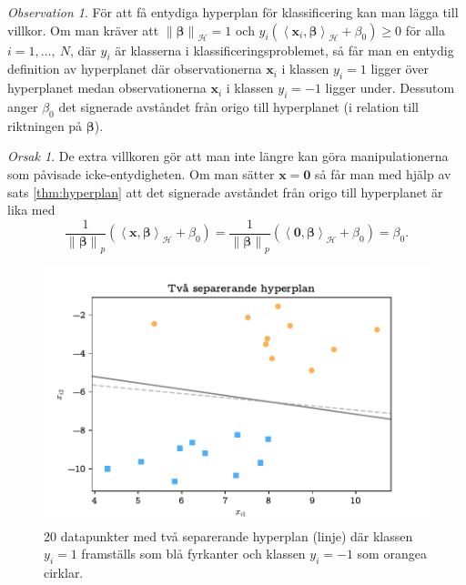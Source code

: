 \documentclass[a4paper, 12pt]{report}
\theoremstyle{definition}
\theoremstyle{remark}
\newtheorem*{rem}{Observation}
\newtheorem*{reas}{Orsak}
\newcommand{\bfbeta}{{\boldsymbol{\beta}}}
\newcommand{\bfx}{\mathbf{x}}
\newcommand{\llangle}{\left\langle}
\newcommand{\rrangle}{\right\rangle}
\newcommand{\inner}[2]{\llangle #1, #2 \rrangle}
\newcommand{\hil}{\mathcal{H}}
\begin{document}
\begin{rem}
	För att få entydiga hyperplan för klassificering kan man lägga till villkor. Om man kräver att $\left\|\bfbeta\right\|_\hil=1$ och $y_i\left(\inner{\bfx_i}{\bfbeta}_\hil + \beta_0\right)\geq0$ för alla $i=1,\dots,~N$, där $y_i$ är klasserna i klassificeringsproblemet, så får man en entydig definition av hyperplanet där observationerna $\bfx_i$ i klassen $y_i=1$ ligger över hyperplanet medan observationerna $\bfx_i$ i klassen $y_i=-1$ ligger under.
	Dessutom anger $\beta_0$ det signerade avståndet från origo till hyperplanet (i relation till riktningen på $\bfbeta$).
\end{rem}
\begin{reas}
	De extra villkoren gör att man inte längre kan göra manipulationerna som påvisade icke-entydigheten. Om man sätter $\mathbf{x}=\mathbf{0}$ så får man med hjälp av sats \ref{thm:hyperplan} att det signerade avståndet från origo till hyperplanet är lika med
	\begin{equation*}
	\frac{1}{\left\|\bfbeta
\right\|_p}\left(\inner{\bfx}{\bfbeta}_\hil+\beta_0\right)=\frac{1}{\left\|\bfbeta
\right\|_p}\left(\inner{\mathbf{0}}{\bfbeta}_\hil+\beta_0\right)=\beta_0.
	\end{equation*}
\end{reas}

\begin{figure}[h]
\centering
\includegraphics[width=0.8\linewidth, trim={0.5cm 2mm 0.5cm 6mm}, clip]{KandFigur1.pdf}
\caption{\label{fig:separatinghyperplane}20 datapunkter med två separerande hyperplan (linje) där klassen $y_i=1$ framställs som blå fyrkanter och klassen $y_i=-1$ som orangea cirklar.}
\end{figure}
\end{document}

